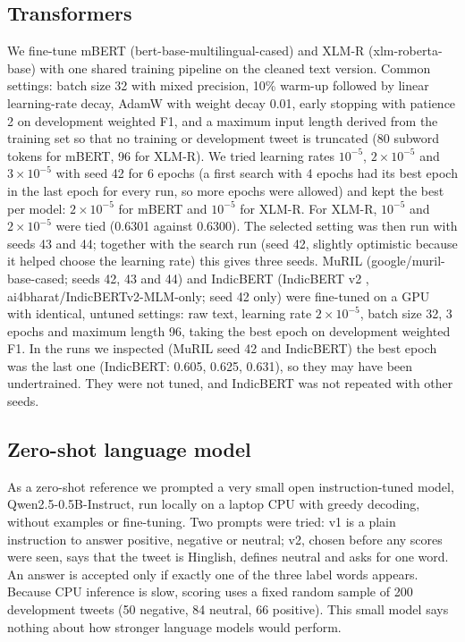 \documentclass{nle}
\begin{document}
\subsection{Transformers}
We fine-tune mBERT (bert-base-multilingual-cased) and XLM-R (xlm-roberta-base) with one shared training pipeline on the
cleaned text version. Common settings: batch size 32 with mixed precision, 10\% warm-up followed by linear learning-rate
decay, AdamW with weight decay 0.01, early stopping with patience 2 on development weighted F1, and a maximum input length
derived from the training set so that no training or development tweet is truncated (80 subword tokens for mBERT, 96 for
XLM-R). We tried learning rates $10^{-5}$, $2\times10^{-5}$ and $3\times10^{-5}$ with seed 42 for 6 epochs (a first search
with 4 epochs had its best epoch in the last epoch for every run, so more epochs were allowed) and kept the best per model:
$2\times10^{-5}$ for mBERT and $10^{-5}$ for XLM-R. For XLM-R, $10^{-5}$ and $2\times10^{-5}$ were tied (0.6301 against
0.6300). The selected setting was then run with seeds 43 and 44; together with the search run (seed 42, slightly optimistic
because it helped choose the learning rate) this gives three seeds. MuRIL (google/muril-base-cased; seeds 42, 43 and 44) and IndicBERT (IndicBERT v2 \cite{doddapaneni2023}, ai4bharat/IndicBERTv2-MLM-only; seed 42 only)
were fine-tuned on a GPU with identical, untuned settings: raw text, learning rate $2\times10^{-5}$, batch size 32, 3 epochs and
maximum length 96, taking the best epoch on development weighted F1. In the runs we inspected (MuRIL seed 42 and IndicBERT) the
best epoch was the last one (IndicBERT: 0.605, 0.625, 0.631), so they may have been undertrained. They were not tuned, and
IndicBERT was not repeated with other seeds.

\subsection{Zero-shot language model}
As a zero-shot reference we prompted a very small open instruction-tuned model, Qwen2.5-0.5B-Instruct, run locally on a
laptop CPU with greedy decoding, without examples or fine-tuning. Two prompts were tried: v1 is a plain instruction to
answer positive, negative or neutral; v2, chosen before any scores were seen, says that the tweet is Hinglish, defines
neutral and asks for one word. An answer is accepted only if exactly one of the three label words appears. Because CPU
inference is slow, scoring uses a fixed random sample of 200 development tweets (50 negative, 84 neutral, 66 positive).
This small model says nothing about how stronger language models would perform.
\end{document}
